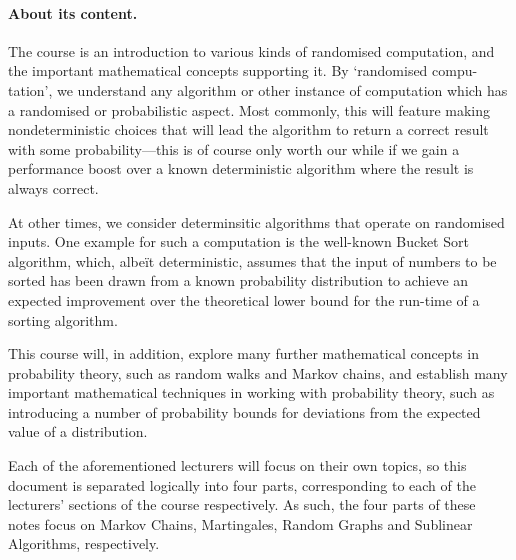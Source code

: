 	\paragraph{About its content.}
	The course is an introduction to various kinds of randomised computation, and the important 
	mathematical concepts supporting it.  By ‘randomised compu-tation’, we understand any 
	algorithm or other instance of computation which has a randomised or probabilistic aspect.  
	Most commonly, this will feature making nondeterministic choices that will lead the algorithm 
	to return a correct result with some probability---this is of course only worth our while if 
	we gain a performance boost over a known deterministic algorithm where the result is always 
	correct.\par
	At other times, we consider determinsitic algorithms that operate on randomised inputs. One 
	example for such a computation is the well-known Bucket Sort algorithm, which, albe\"it 
	deterministic, assumes that the input of numbers to be sorted has been drawn from a known 
	probability distribution to achieve an expected improvement over the theoretical lower bound 
	for the run-time of a sorting algorithm.\par 
	This  course  will,  in  addition,  explore  many  further  mathematical  concepts  in  
	probability theory, such as random walks and Markov chains, and establish many important 
	mathematical techniques in working with probability theory, such as introducing a number of 
	probability bounds for deviations from the expected value of a distribution. \par
	Each of the aforementioned lecturers will focus on their own topics, so this document is 
	separated logically into four parts,  corresponding to each of the lecturers’ sections of the 
	course respectively.  As such, the four parts of these notes focus on Markov Chains, Martingales, 
	Random Graphs and Sublinear Algorithms, respectively.
